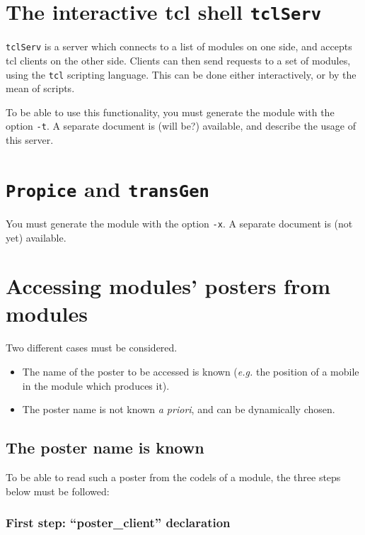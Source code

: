 \section{The interactive tcl shell {\tt tclServ}}
\label{sec|tcl}

{\tt tclServ} is  a server which  connects to  a  list of modules on  one
side, and accepts  tcl clients on  the other side.  Clients can then send
requests to  a   set   of   modules,  using the    {\tt  tcl}   scripting
language. This  can  be done  either interactively,  or  by the  mean  of
scripts.

To be able to use  this functionality, you must  generate the module with
the  option {\tt -t}.  A separate document   is (will be?) available, and
describe the usage of this server.


\section{{\tt Propice} and {\tt transGen}}
\label{sec|propice}

You must generate the module with the option {\tt -x}.
A separate document is (not yet) available.


\section{Accessing modules' posters from modules}

Two different cases must be considered.
\begin{itemize}
\item The name of the poster to be accessed is known ({\em e.g.} the
position of a mobile in the module which produces it).
\item The poster name is not known {\em a priori}, and can be dynamically
chosen.
\end{itemize}

\subsection{The poster name is known}

To be able to read such  a poster from the  codels of a module, the three
steps below must be followed:

\subsubsection{First step: ``poster\_client'' declaration}

